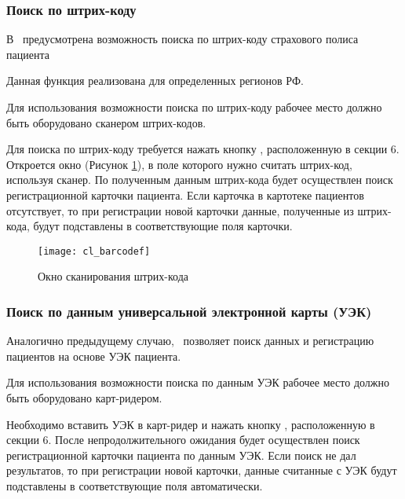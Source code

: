 \subsubsection{Поиск по штрих-коду}

В \tmis~предусмотрена возможность поиска по штрих-коду страхового полиса пациента 

\begin{prim}
 Данная функция реализована для определенных регионов РФ.
\end{prim}

\begin{vnim}
Для использования возможности поиска по штрих-коду рабочее место должно быть оборудовано сканером штрих-кодов.
\end{vnim}

Для поиска по штрих-коду требуется нажать кнопку  , расположенную в секции 6. Откроется окно (Рисунок \ref{img_cl_barcodef}), в поле которого нужно считать штрих-код, используя сканер. По полученным данным штрих-кода будет осуществлен поиск регистрационной карточки пациента. Если карточка в картотеке пациентов отсутствует, то при регистрации новой карточки данные, полученные из штрих-кода, будут подставлены в соответствующие поля карточки.

\begin{figure}[ht]\centering
 \texttt{[image: cl\_barcodef]}
 \caption{Окно сканирования штрих-кода}
 \label{img_cl_barcodef}
\end{figure} 

\subsubsection {Поиск по данным универсальной электронной карты (УЭК)}

Аналогично предыдущему случаю, \tmis~позволяет поиск данных и регистрацию пациентов на основе УЭК пациента.

\begin{vnim}
 Для использования возможности поиска по данным УЭК рабочее место должно быть оборудовано карт-ридером.
\end{vnim}

Необходимо вставить УЭК в карт-ридер и нажать кнопку , расположенную в секции 6. После непродолжительного ожидания будет осуществлен поиск регистрационной карточки пациента по данным УЭК. Если поиск не дал результатов, то при регистрации новой карточки, данные считанные с УЭК будут подставлены в соответствующие поля автоматически.

